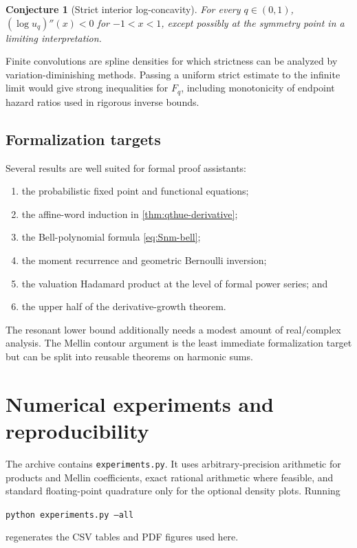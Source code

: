\documentclass[11pt,oneside]{article}
\newtheorem{conjecture}[theorem]{Conjecture}
\theoremstyle{definition}
\theoremstyle{remark}
\begin{document}
\begin{conjecture}[Strict interior log-concavity]
For every $q\in(0,1)$, $(\log u_q)''(x)<0$ for $-1<x<1$, except possibly at the
symmetry point in a limiting interpretation.
\end{conjecture}

Finite convolutions are spline densities for which strictness can be analyzed by
variation-diminishing methods.  Passing a uniform strict estimate to the infinite
limit would give strong inequalities for $F_q$, including monotonicity of endpoint
hazard ratios used in rigorous inverse bounds.

\subsection{Formalization targets}

Several results are well suited for formal proof assistants:
\begin{enumerate}[label=(\roman*)]
\item the probabilistic fixed point and functional equations;
\item the affine-word induction in \cref{thm:qthue-derivative};
\item the Bell-polynomial formula \eqref{eq:Snm-bell};
\item the moment recurrence and geometric Bernoulli inversion;
\item the valuation Hadamard product at the level of formal power series; and
\item the upper half of the derivative-growth theorem.
\end{enumerate}
The resonant lower bound additionally needs a modest amount of real/complex analysis.
The Mellin contour argument is the least immediate formalization target but can be
split into reusable theorems on harmonic sums.

\section{Numerical experiments and reproducibility}
\label{sec:numerics}

The archive contains \texttt{experiments.py}.  It uses arbitrary-precision arithmetic
for products and Mellin coefficients, exact rational arithmetic where feasible, and
standard floating-point quadrature only for the optional density plots.  Running
\begin{center}
\texttt{python experiments.py --all}
\end{center}
regenerates the CSV tables and PDF figures used here.
\end{document}
